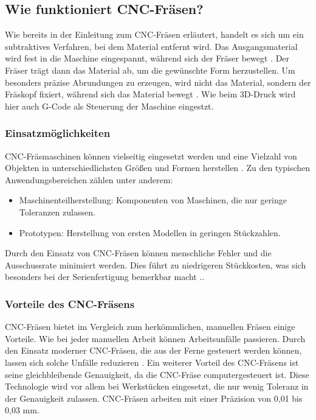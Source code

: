 \subsection{Wie funktioniert CNC-Fräsen?}
Wie bereits in der Einleitung zum CNC-Fräsen erläutert, handelt es sich um ein subtraktives Verfahren, bei dem Material entfernt wird. Das Ausgangsmaterial wird fest in die Maschine eingespannt, während sich der Fräser bewegt \textcite{CNCFraesen2}. Der Fräser trägt dann das Material ab, um die gewünschte Form herzustellen. Um besonders präzise Abrundungen zu erzeugen, wird nicht das Material, sondern der Fräskopf fixiert, während sich das Material bewegt  \textcite{CNCFraesen3}. Wie beim 3D-Druck wird hier auch G-Code als Steuerung der Maschine eingestzt. \\



\subsubsection{Einsatzmöglichkeiten}
CNC-Fräsmaschinen können vielseitig eingesetzt werden und eine Vielzahl von Objekten in unterschiedlichsten Größen und Formen herstellen  \textcite{CNCFraesen2}. Zu den typischen Anwendungsbereichen zählen unter anderem:

\begin{itemize}
	\item Maschinenteilherstellung: Komponenten von Maschinen, die nur geringe Toleranzen zulassen.
	\item Prototypen: Herstellung von ersten Modellen in geringen Stückzahlen.
\end{itemize}

Durch den Einsatz von CNC-Fräsen können menschliche Fehler und die Ausschussrate minimiert werden. Dies führt zu niedrigeren Stückkosten, was sich besonders bei der Serienfertigung bemerkbar macht  \textcite{CNCFraesen3}..\\


\subsubsection{Vorteile des CNC-Fräsens}
CNC-Fräsen bietet im Vergleich zum herkömmlichen, manuellen Fräsen einige Vorteile. Wie bei jeder manuellen Arbeit können Arbeitsunfälle passieren. Durch den Einsatz moderner CNC-Fräsen, die aus der Ferne gesteuert werden können, lassen sich solche Unfälle reduzieren \textcite{CNCFraesenVorteile}. Ein weiterer Vorteil des CNC-Fräsens ist seine gleichbleibende Genauigkeit, da die CNC-Fräse computergesteuert ist. Diese Technologie wird vor allem bei Werkstücken eingesetzt, die nur wenig Toleranz in der Genauigkeit zulassen. CNC-Fräsen arbeiten mit einer Präzision von 0,01 bis 0,03 mm. \\


